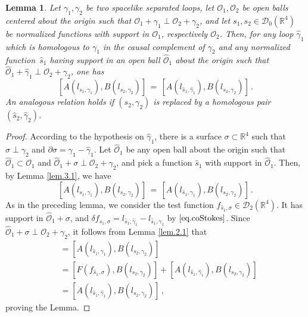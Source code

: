 \documentclass[11pt]{article}
\newtheorem{lemma}[theorem]{Lemma}
\numberwithin{equation}{section}
\newcommand{\RR}{{\mathbb R}}
\newcommand{\Dc}{{\mathcal{D}}}
\newcommand{\Oc}{{\mathcal{O}}}
\begin{document}
%
\begin{lemma}
\label{lem.3.2}
Let $\gamma_1,\gamma_2$ be two spacelike separated loops, 
let $\Oc_1,\Oc_2$  be open balls centered about the origin 
such that $\Oc_1 + \gamma_1 \perp \Oc_2 + \gamma_2$,  
and let $s_1,s_2 \in \Dc_0(\RR^4)$ be normalized  
functions with support in $\Oc_1$, respectively $\Oc_2$. 
Then, for any loop $\widehat \gamma_1$ which is homologous to 
$\gamma_1$ in the causal complement of $\gamma_2$
and any normalized function~$\widehat s_1$ 
having support in an open ball $\widehat \Oc_1$ 
about the origin such that $\widehat \Oc_1 + \widehat \gamma_1 
\perp \Oc_2 + \gamma_2$, one has 
%
$$
[ A(l_{s_1,\gamma_1})  , B(l_{s_2,\gamma_2}) ] 
\, = \,
[ A(l_{\widehat s_1,\widehat \gamma_1}) , B(l_{s_2,\gamma_2}) ] \, .
$$
%
An analogous relation holds if 
$(s_2, \gamma_2)$ is replaced by a homologous  
pair~$(\widehat s_2, \widehat \gamma_2)$.  
\end{lemma}
\begin{proof}
According to the  hypothesis on $\widehat \gamma_1$,  
there is a surface $\sigma \subset \RR^4$ such that 
%
$\sigma \perp \gamma_2$ and 
$\partial \sigma = \gamma_1 - \widehat \gamma_1 $. 
Let $\widehat \Oc_1$ be any open ball
about the origin such that 
$\widehat \Oc_1 \subset \Oc_1$ and 
$\widehat \Oc_1 + \sigma \perp \Oc_2 + \gamma_2$, and pick  
a function $\widehat s_1$ with support in 
$\widehat \Oc_1$. Then, by Lemma \ref{lem.3.1}, we have 
$$
[ A(l_{s_1,\gamma_1})  , B(l_{s_2,\gamma_2}) ] 
\, = \,
[ A(l_{\widehat s_1,\gamma_1}) , B(l_{s_2,\gamma_2}) ] \, . 
$$
As in the preceding lemma, we consider the 
test function $f_{\widehat s_1,\sigma} \in \Dc_2(\RR^4)$. It has support 
in $\widehat \Oc_1 + \sigma$, and 
$\delta f_{\widehat s_1,\sigma} =   
l_{\widehat s_1, \widehat \gamma_1} - 
l_{\widehat s_1, \gamma_1}$ by  
$\eqref{eq.coStokes}$.
Since $\widehat \Oc_1 + \sigma\perp \Oc_2+\gamma_2$,  
it follows from Lemma \ref{lem.2.1} that   
%
\begin{align*}
[ A(l_{s_1,\gamma_1})  , B(l_{s_2,\gamma_2}) ] 
 & = 
[ A(l_{\widehat s_1,\gamma_1}) , B(l_{s_2,\gamma_2}) ] \\
& = 
[ F(f_{\widehat s_1,\sigma}) , B(l_{s_2,\gamma_2}) ] + 
[ A(l_{\widehat s_1, \widehat \gamma_1}) , B(l_{s_2,\gamma_2}) ]\\
 & = 
[ A(l_{\widehat s_1, \widehat \gamma_1}) , B(l_{s_2,\gamma_2}) ] \, ,
\end{align*}
%
proving the Lemma.
\end{proof}
\end{document}
